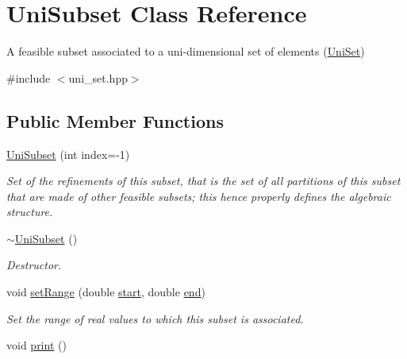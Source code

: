 \hypertarget{classUniSubset}{\section{Uni\-Subset Class Reference}
\label{classUniSubset}
}


A feasible subset associated to a uni-\/dimensional set of elements (\hyperlink{classUniSet}{Uni\-Set})  




{\ttfamily \#include $<$uni\-\_\-set.\-hpp$>$}

\subsection*{Public Member Functions}
\begin{DoxyCompactItemize}
\item 
\hyperlink{classUniSubset_a07ff3af1804ad82899583c0207b233dc}{Uni\-Subset} (int index=-\/1)
\begin{DoxyCompactList}\small\item\em Set of the refinements of this subset, that is the set of all partitions of this subset that are made of other feasible subsets; this hence properly defines the algebraic structure. \end{DoxyCompactList}\item 
\hypertarget{classUniSubset_a84519a983473e56ad479d29baff45a34}{\hyperlink{classUniSubset_a84519a983473e56ad479d29baff45a34}{$\sim$\-Uni\-Subset} ()}\label{classUniSubset_a84519a983473e56ad479d29baff45a34}

\begin{DoxyCompactList}\small\item\em Destructor. \end{DoxyCompactList}\item 
void \hyperlink{classUniSubset_a37228283b3d2884f16ec06c523af9791}{set\-Range} (double \hyperlink{classUniSubset_af66bade84710d674e3e29b0ebfe16871}{start}, double \hyperlink{classUniSubset_a05f26ad45250f4adba9dc4eae35d3f72}{end})
\begin{DoxyCompactList}\small\item\em Set the range of real values to which this subset is associated. \end{DoxyCompactList}\item 
\hypertarget{classUniSubset_a1be7871c599958a13258e51b01832c25}{void \hyperlink{classUniSubset_a1be7871c599958a13258e51b01832c25}{print} ()}\label{classUniSubset_a1be7871c599958a13258e51b01832c25}


\end{DoxyCompactItemize}
